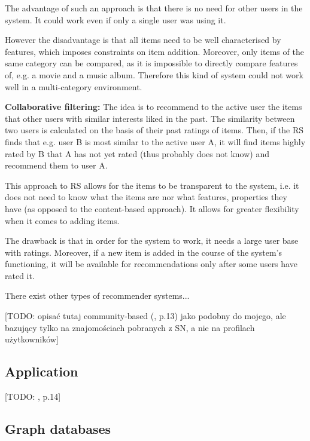 \documentclass[12pt]{report}
\begin{document}
The advantage of such an approach is that there is no need for other users in the system. It could work even if only a single user was using it.

However the disadvantage is that all items need to be well characterised by features, which imposes constraints on item addition. Moreover, only items of the same category can be compared, as it is impossible to directly compare features of, e.g. a movie and a music album. Therefore this kind of system could not work well in a multi-category environment.

\hbox{}
{\bf Collaborative filtering:} The idea is to recommend to the active user the items that other users with similar interests liked in the past. The similarity between two users is calculated on the basis of their past ratings of items. Then, if the RS finds that e.g. user B is most similar to the active user A, it will find items highly rated by B that A has not yet rated (thus probably does not know) and recommend them to user A.

This approach to RS allows for the items to be transparent to the system, i.e. it does not need to know what the items are nor what features, properties they have (as opposed to the content-based approach). It allows for greater flexibility when it comes to adding items.

The drawback is that in order for the system to work, it needs a large user base with ratings. Moreover, if a new item is added in the course of the system's functioning, it will be available for recommendations only after some users have rated it.

\hbox{}
There exist other types of recommender systems...

[TODO: opisać tutaj community-based (\cite{rec_sys_handbook}, p.13) jako podobny do mojego, ale bazujący tylko na znajomościach pobranych z SN, a nie na profilach użytkowników]

\subsection{Application}
[TODO: \cite{rec_sys_handbook}, p.14]

\subsection{Graph databases}
\end{document}
